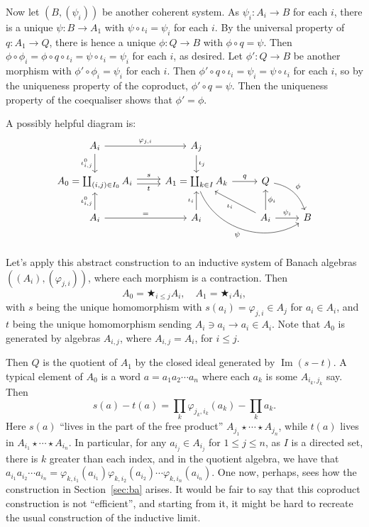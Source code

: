 \documentclass[a4paper,11pt]{article}
\newcommand{\im}{\operatorname{Im}}
\theoremstyle{definition}
\begin{document}
Now let $(B,(\psi_i))$ be another coherent system.  As $\psi_i\colon A_i\to B$ for each $i$, there is a unique $\psi \colon B \to A_1$ with $\psi\circ\iota_i = \psi_i$ for each $i$.  By the universal property of $q\colon A_1\to Q$, there is hence a unique $\phi \colon Q \to B$ with $\phi\circ q = \psi$.  Then $\phi\circ\phi_i = \phi\circ q\circ\iota_i = \psi\circ\iota_i = \psi_i$ for each $i$, as desired.  Let $\phi'\colon Q\to B$ be another morphism with $\phi'\circ\phi_i = \psi_i$ for each $i$.  Then $\phi'\circ q\circ\iota_i = \psi_i = \psi\circ\iota_i$ for each $i$, so by the uniqueness property of the coproduct, $\phi'\circ q = \psi$.  Then the uniqueness property of the coequaliser shows that $\phi' = \phi$.

A possibly helpful diagram is:
\[\begin{tikzcd}
    A_i \arrow[d, "\iota^0_{i,j}"'] \arrow[r, "\varphi_{j,i}"] & A_j \arrow[d, "\iota_j"]
\\
    A_0 = \coprod_{(i,j)\in I_0} A_i \arrow[r, shift left, "s"] \arrow[r, shift right, "t"'] & A_1 = \coprod_{k\in I} A_k \arrow[r, "q"] \arrow[rrd, bend right=50, "\psi"']
    & Q \arrow[rd, "\phi", bend left]
\\
   A_i \arrow[u, "\iota^0_{i,j}"] \arrow[r, "="] & A_i \arrow[u, "\iota_i"]
   & A_i \arrow[ul, "\iota_i"] \arrow[u, "\phi_i"'] \arrow[r, "\psi_i"]
   & B
\end{tikzcd} \]

Let's apply this abstract construction to an inductive system of Banach algebras $((A_i), (\varphi_{j,i}))$, where each morphism is a contraction.  Then
\[ A_0 = \bigstar_{i\leq j} A_i, \quad A_1 = \bigstar_i A_i, \]
with $s$ being the unique homomorphism with $s(a_i) = \varphi_{j,i} \in A_j$ for $a_i\in A_i$, and $t$ being the unique homomorphism sending $A_i \ni a_i \to a_i \in A_i$.  Note that $A_0$ is generated by algebras $A_{i,j}$, where $A_{i,j} = A_i$, for $i\leq j$.

Then $Q$ is the quotient of $A_1$ by the closed ideal generated by $\im(s-t)$.  A typical element of $A_0$ is a word $a = a_1a_2\cdots a_n$ where each $a_k$ is some $A_{i_k,j_k}$ say.  Then
\[ s(a) - t(a) = \prod_k \varphi_{j_k, i_k}(a_k) - \prod_k a_k. \]
Here $s(a)$ ``lives in the part of the free product'' $A_{j_1}\star\cdots\star A_{j_n}$, while $t(a)$ lives in $A_{i_1}\star\cdots\star A_{i_n}$.  In particular, for any $a_{i_j} \in A_{i_j}$ for $1\leq j\leq n$, as $I$ is a directed set, there is $k$ greater than each index, and in the quotient algebra, we have that $a_{i_1}a_{i_2}\cdots a_{i_n} = \varphi_{k, i_1}(a_{i_1})\varphi_{k, i_2}(a_{i_2}) \cdots \varphi_{k, i_n}(a_{i_n})$.  One now, perhaps, sees how the construction in Section~\ref{sec:ba} arises.  It would be fair to say that this coproduct construction is not ``efficient'', and starting from it, it might be hard to recreate the usual construction of the inductive limit.
\end{document}
